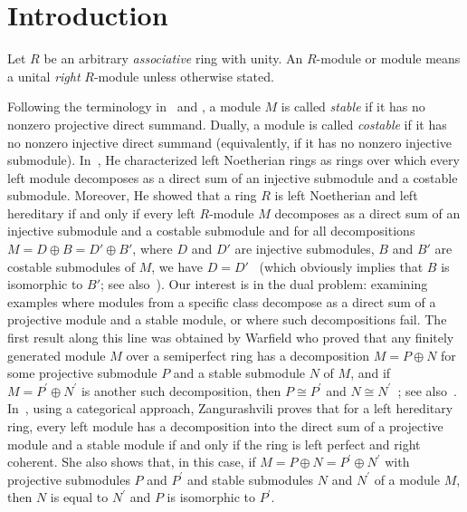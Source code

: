 \documentclass[11pt,a4paper]{amsart}
\theoremstyle{plain}
\theoremstyle{definition}
\theoremstyle{remark}
\begin{document}
\section{Introduction}

Let $R$ be an arbitrary \emph{associative} ring with unity. An $R$-module or module means a unital \emph{right} $R$-module unless otherwise stated.

Following the terminology in~\cite{Martsinkovsky:1TorsionOfFiniteModulesOverSemiperfectRings, Martsinkovsky:TheStableCategoryOfALeftHereditaryRing} and  \cite{Zangurashvili:AStructureTheoremForLeftModulesOverLeftHereditaryLeftPerfectRightCoherentRings}, {a module $M$ is called \emph{stable} if it has no nonzero projective direct summand. Dually, a module is called \emph{costable} if it has no nonzero injective direct summand (equivalently, if it has no nonzero injective submodule).}
In~\cite{HeZhengXu:CharacterizationsOfNoetherianAndHereditaryRings}, He characterized left Noetherian rings {as rings over which every left module decomposes as a direct sum of an injective submodule and a costable submodule}. Moreover, He showed that a ring $ R $ is left Noetherian and left hereditary if and only if every left $ R $-module $ M $ decomposes as a direct sum of an injective submodule and a costable submodule and for all decompositions  $ M=D\oplus B = D'\oplus B'$, where $ D $ and $ D' $ are injective submodules, $ B $ and $ B' $ are costable submodules of $ M $, we have $ D=D' $~\cite[Theorem 2]{HeZhengXu:CharacterizationsOfNoetherianAndHereditaryRings}
 (which obviously implies that $ B $ is isomorphic to $ B' $; see also~\cite{Zangurashvili:AStructureTheoremForLeftModulesOverLeftHereditaryLeftPerfectRightCoherentRings}). Our interest is in the dual problem: examining examples where modules from a specific class decompose as a direct sum of a projective module and a stable module, or where such decompositions fail.
The first result along this line was obtained by Warfield who proved that any finitely generated module $ M $ over a semiperfect ring has a decomposition $M=P \oplus N$ for some projective submodule $P$ and a stable submodule $N$ of $M$,  and   if $M=P^{\prime} \oplus N^{\prime}$ is another such decomposition, then $P \cong P^{\prime}$ and $N \cong N^{\prime}$~\cite[Theorem 1.4]{Warfield:SerialRingsAndFinitelyPresentedModules}; see also~\cite[Theorem 3.15]{Facchini:ModuleTheory}. In~\cite{Zangurashvili:AStructureTheoremForLeftModulesOverLeftHereditaryLeftPerfectRightCoherentRings}, using a categorical approach, Zangurashvili proves that for a left hereditary ring, every left module has a decomposition into the direct sum of a projective module and a stable module if and only if the ring is left perfect and right coherent. She also shows that, in this case,
 if $M=P \oplus N=P^{\prime} \oplus N^{\prime}$ with projective submodules $P$ and $P^{\prime}$ and stable submodules $N$ and $N^{\prime}$ of a module $ M $, then $N$ is equal to $N^{\prime}$ and $P$ is isomorphic to $P^{\prime}$.
\end{document}

